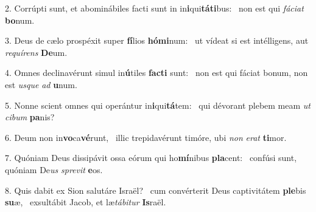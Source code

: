 2. Corrúpti sunt, et abominábiles facti sunt in in\textbf{i}qui\textbf{tá}\textbf{ti}bus: \ast\  non est qui \textit{fá}\textit{ci}\textit{at} \textbf{bo}num.\

3. Deus de cælo prospéxit super \textbf{fí}lios \textbf{hó}\textbf{mi}num: \ast\  ut vídeat si est intélligens, aut \textit{re}\textit{quí}\textit{rens} \textbf{De}um.\

4. Omnes declinavérunt simul in\textbf{ú}tiles \textbf{fac}\textbf{ti} sunt: \ast\  non est qui fáciat bonum, non est \textit{us}\textit{que} \textit{ad} \textbf{u}num.\

5. Nonne scient omnes qui operántur in\textbf{i}qui\textbf{tá}tem: \ast\  qui dévorant plebem meam \textit{ut} \textit{ci}\textit{bum} \textbf{pa}nis?\

6. Deum non in\textbf{vo}ca\textbf{vé}runt, \ast\  illic trepidavérunt timóre, ubi \textit{non} \textit{e}\textit{rat} \textbf{ti}mor.\

7. Quóniam Deus dissipávit ossa eórum qui ho\textbf{mí}nibus \textbf{pla}cent: \ast\  confúsi sunt, quóniam De\textit{us} \textit{spre}\textit{vit} \textbf{e}os.\

8. Quis dabit ex Sion salutáre Israël? \dag\  cum convérterit Deus captivitátem \textbf{ple}bis \textbf{su}æ, \ast\  exsultábit Jacob, et læ\textit{tá}\textit{bi}\textit{tur} \textbf{Is}raël.\

